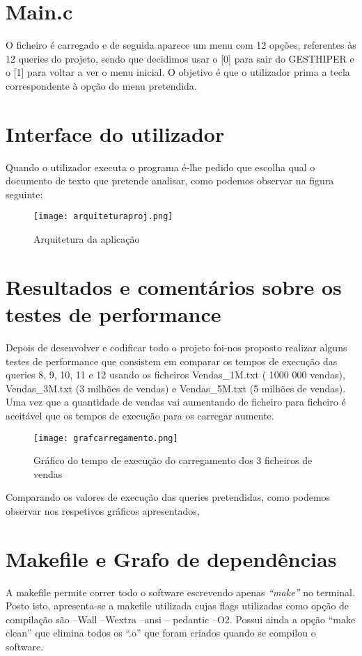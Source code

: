 \chapter{Main.c}
O ficheiro é carregado e de seguida aparece um menu com 12 opções, referentes às 12 queries do projeto, sendo que decidimos usar o [0] para sair do GESTHIPER e o [1] para voltar a ver o menu inicial. O objetivo é que o utilizador prima a tecla correspondente à opção do menu pretendida.



\chapter{Interface do utilizador}
Quando o utilizador executa o programa é-lhe pedido que escolha qual o documento de texto que pretende analisar, como podemos observar na figura seguinte: 

\begin{figure}[h!]
	\texttt{[image: arquiteturaproj.png]}  
	\caption{Arquitetura da aplicação}  
\end{figure}



\chapter{Resultados e comentários sobre os testes de performance}
Depois de desenvolver e codificar todo o projeto foi-nos proposto realizar alguns testes de performance que consistem em comparar os tempos de execução das queries 8, 9, 10, 11 e 12 usando os ficheiros Vendas\_1M.txt ( 1000 000 vendas), Vendas\_3M.txt (3 milhões de vendas) e Vendas\_5M.txt (5 milhões de vendas).
Uma vez que a quantidade de vendas vai aumentando de ficheiro para ficheiro é aceitável que os tempos de execução para os carregar aumente.


\begin{figure}[h!]
	\centering
	\texttt{[image: grafcarregamento.png]}  
	\caption{Gráfico do tempo de execução do carregamento dos 3 ficheiros de vendas}  
\end{figure}

Comparando os valores de execução das queries pretendidas, como podemos observar nos respetivos gráficos apresentados,




\chapter{Makefile e Grafo de dependências}
A makefile permite correr todo o software escrevendo apenas \textit{“make”} no terminal. Posto isto, apresenta-se a makefile utilizada cujas flags utilizadas como opção de compilação são –Wall –Wextra –ansi – pedantic –O2.
Possui ainda a opção “make clean” que elimina todos os “.o” que foram criados quando se compilou o software.

